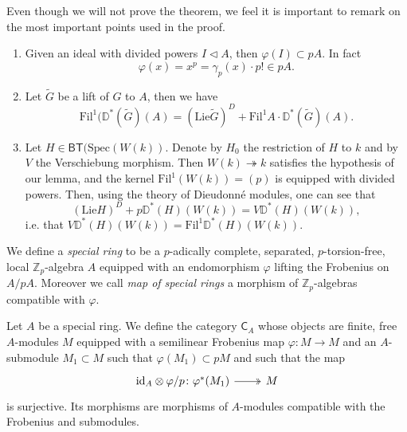 \begin{rem}[]\label{rem:A2Kisin}
	Even though we will not prove the theorem, we feel it is important to remark on
	the most important points used in the proof.
\begin{enumerate}
	\item Given an ideal with divided powers $I \triangleleft A$, then $\varphi(I) \subset pA$.
		In fact 
		\begin{equation*}
			\varphi(x) = x^p = \gamma_p(x) \cdot p! \in pA
		.\end{equation*}

	\item Let $\widetilde{G}$ be a lift of $G$ to $A$, then we have
		\begin{equation*}
			\mathrm{Fil}^1(\mathbb{D}^*(\widetilde{G})(A) =
			( \mathrm{Lie} \widetilde{G} )^D +
			\mathrm{Fil}^1A \cdot \mathbb{D}^*(\widetilde{G})(A)
		.\end{equation*}
		
	\item Let $H \in \mathsf{BT}(\mathrm{Spec}(W(k))$. Denote by $H_0$ the restriction
		of $H$ to $k$ and by $V$ the Verschiebung morphism.
		Then $W(k) \twoheadrightarrow k$ satisfies the hypothesis of our lemma,
		and the kernel $\mathrm{Fil}^1(W(k)) = (p)$ is equipped with divided powers.
		Then, using the theory of Dieudonné modules, one can see that
		\begin{equation*}
			( \mathrm{Lie} H)^D + p \mathbb{D}^*(H)(W(k)) =
			V \mathbb{D}^{*}(H)(W(k))
		,\end{equation*}
		i.e. that
		$V \mathbb{D}^*(H)(W(k)) = \mathrm{Fil}^1 \mathbb{D}^*(H)(W(k))$.
\end{enumerate}
\end{rem}


\begin{defn}
	We define a {\em special ring} to be a $p$-adically complete, separated, $p$-torsion-free,
	local $\mathbb{Z}_{p}$-algebra $A$ equipped with an endomorphism $\varphi$
	lifting the Frobenius on $A/pA$.
	Moreover we call {\em map of special rings} a morphism
	of $\mathbb{Z}_{p}$-algebras compatible with $\varphi$.
\end{defn}


\begin{defn}[]
	Let $A$ be a special ring. We define the category
	$\mathsf{C}_A$ whose objects are finite, free $A$-modules
	$M$ equipped with a semilinear Frobenius map $\varphi\colon M \to M$
	and an $A$-submodule $M_1 \subset M$ such that $\varphi(M_1) \subset pM$
	and such that the map
	\begin{equation*}
	\begin{tikzcd}[row sep = 0ex
		,/tikz/column 1/.append style={anchor=base east}
		,/tikz/column 2/.append style={anchor=base west}]
		\mathrm{id}_{ A }\otimes\varphi/p\colon 
		\varphi^*(M_1) \arrow[r, "", twoheadrightarrow] &
		M
	\end{tikzcd}
	\end{equation*} 
	is surjective.
	Its morphisms are morphisms of $A$-modules compatible with
	the Frobenius and submodules.
\end{defn}


